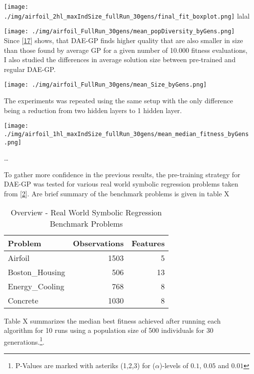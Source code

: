 \documentclass[
  11pt,
]{article}
\let\origfigure\figure
\let\endorigfigure\endfigure
\renewenvironment{figure}[1][2] {
    \expandafter\origfigure\expandafter[H]
} {
    \endorigfigure
}
\begin{document}
\texttt{[image: ./img/airfoil\_2hl\_maxIndSize\_fullRun\_30gens/final\_fit\_boxplot.png]}
lalal

\texttt{[image: ./img/airfoil\_FullRun\_30gens/mean\_popDiversity\_byGens.png]}
Since {[}\protect\hyperlink{ref-dae-gp_2022_symreg}{17}{]} shows, that
DAE-GP finds higher quality that are also smaller in size than those
found by average GP for a given number of 10.000 fitness evaluations, I
also studied the differences in average solution size between
pre-trained and regular DAE-GP.

\begin{figure}
\centering
\texttt{[image: ./img/airfoil\_FullRun\_30gens/mean\_Size\_byGens.png]}
\caption{Average Solution Size over 30 Generations - Airfoil}
\end{figure}

The experiments was repeated using the same setup with the only
difference being a reduction from two hidden layers to 1 hidden layer.

\begin{figure}
\centering
\texttt{[image: ./img/airfoil\_1hl\_maxIndSize\_fullRun\_30gens/mean\_median\_fitness\_byGens.png]}
\caption{Best Fitness over 30 Generations - 1 hidden Layer - Airfoil}
\end{figure}

\ldots{}

To gather more confidence in the previous results, the pre-training
strategy for DAE-GP was tested for various real world symbolic
regression problems taken from
{[}\protect\hyperlink{ref-machine_learning_repo}{2}{]}. Are brief
summary of the benchmark problems is given in table X

\begin{table}[!h]

\caption{\label{tab:full_run_realWorldSymReg_problems}Overview - Real World Symbolic Regression Benchmark Problems}
\centering
\begin{tabular}[t]{l|r|r}
\hline
\textbf{Problem} & \textbf{Observations} & \textbf{Features}\\
\hline
Airfoil & 1503 & 5\\
\hline
Boston\_Housing & 506 & 13\\
\hline
Energy\_Cooling & 768 & 8\\
\hline
Concrete & 1030 & 8\\
\hline
\end{tabular}
\end{table}

Table X summarizes the median best fitness achieved after running each
algorithm for 10 runs using a population size of 500 individuals for 30
generations.\footnote{P-Values are marked with asteriks (1,2,3) for
  (\(\alpha\))-levels of \(0.1\), \(0.05\) and \(0.01\)}.
\end{document}
